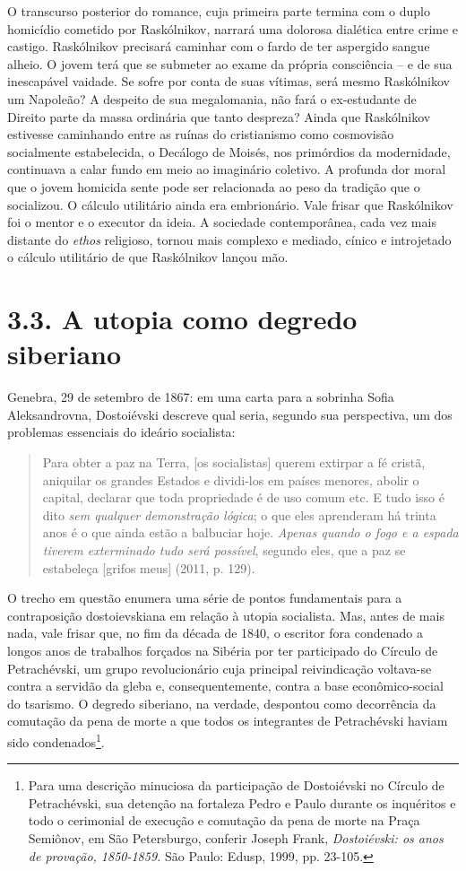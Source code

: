 O transcurso posterior do romance, cuja primeira parte termina com o
duplo homicídio cometido por Raskólnikov, narrará uma dolorosa dialética
entre crime e castigo. Raskólnikov precisará caminhar com o fardo de ter
aspergido sangue alheio. O jovem terá que se submeter ao exame da
própria consciência -- e de sua inescapável vaidade. Se sofre por conta
de suas vítimas, será mesmo Raskólnikov um Napoleão? A despeito de sua
megalomania, não fará o ex-estudante de Direito parte da massa ordinária
que tanto despreza? Ainda que Raskólnikov estivesse caminhando entre as
ruínas do cristianismo como cosmovisão socialmente estabelecida, o
Decálogo de Moisés, nos primórdios da modernidade, continuava a calar
fundo em meio ao imaginário coletivo. A profunda dor moral que o jovem
homicida sente pode ser relacionada ao peso da tradição que o
socializou. O cálculo utilitário ainda era embrionário. Vale frisar que
Raskólnikov foi o mentor e o executor da ideia. A sociedade
contemporânea, cada vez mais distante do \emph{ethos} religioso, tornou
mais complexo e mediado, cínico e introjetado o cálculo utilitário de
que Raskólnikov lançou mão.

\section{3.3. A utopia como degredo siberiano}

Genebra, 29 de setembro de 1867: em uma carta para a sobrinha Sofia
Aleksandrovna, Dostoiévski descreve qual seria, segundo sua perspectiva,
um dos problemas essenciais do ideário socialista:

\begin{quote}
Para obter a paz na Terra, {[}os socialistas{]} querem extirpar a fé
cristã, aniquilar os grandes Estados e dividi-los em países menores,
abolir o capital, declarar que toda propriedade é de uso comum etc. E
tudo isso é dito \emph{sem qualquer demonstração lógica}; o que eles
aprenderam há trinta anos é o que ainda estão a balbuciar hoje.
\emph{Apenas quando o fogo e a espada tiverem exterminado tudo será
possível}, segundo eles, que a paz se estabeleça {[}grifos meus{]}
(2011, p. 129).
\end{quote}

O trecho em questão enumera uma série de pontos fundamentais para a
contraposição dostoievskiana em relação à utopia socialista. Mas, antes
de mais nada, vale frisar que, no fim da década de 1840, o escritor fora
condenado a longos anos de trabalhos forçados na Sibéria por ter
participado do Círculo de Petrachévski, um grupo revolucionário cuja
principal reivindicação voltava-se contra a servidão da gleba e,
consequentemente, contra a base econômico-social do tsarismo. O degredo
siberiano, na verdade, despontou como decorrência da comutação da pena
de morte a que todos os integrantes de Petrachévski haviam sido
condenados\footnote{Para uma descrição minuciosa da participação de
  Dostoiévski no Círculo de Petrachévski, sua detenção na fortaleza
  Pedro e Paulo durante os inquéritos e todo o cerimonial de execução e
  comutação da pena de morte na Praça Semiônov, em São Petersburgo,
  conferir Joseph Frank, \emph{Dostoiévski: os anos de provação,
  1850-1859.} São Paulo: Edusp, 1999, pp. 23-105.}.

